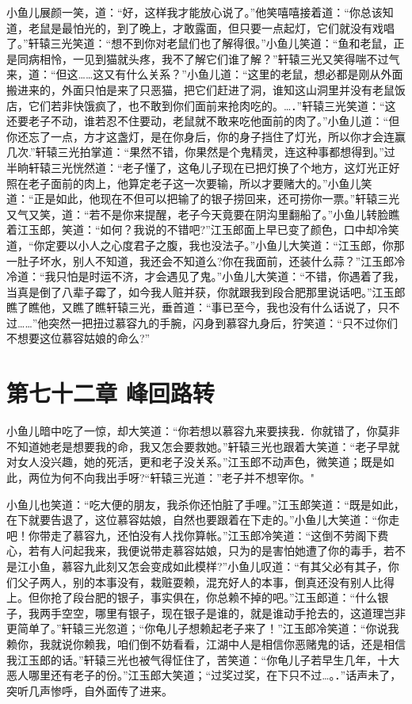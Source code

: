 \documentclass[12pt,oneside]{book}
\begin{document}
小鱼儿展颜一笑，道：``好，这样我才能放心说了。''他笑嘻嘻接着道：``你总该知道，老鼠是最怕光的，到了晚上，才敢露面，但只要一点起灯，它们就没有戏唱了。''轩辕三光笑道：``想不到你对老鼠们也了解得很。''小鱼儿笑道：``鱼和老鼠，正是同病相怜，一见到猫就头疼，我不了解它们谁了解？''轩辕三光又笑得喘不过气来，道：``但这\ldots\ldots 这又有什么关系？''小鱼儿道：``这里的老鼠，想必都是刚从外面搬进来的，外面只怕是来了只恶猫，把它们赶进了洞，谁知这山洞里并没有老鼠饭店，它们若非快饿疯了，也不敢到你们面前来抢肉吃的。\ldots．''轩辕三光笑道：``这还要老子不动，谁若忍不住要动，老鼠就不敢来吃他面前的肉了。''小鱼儿道：``但你还忘了一点，方才这盏灯，是在你身后，你的身子挡住了灯光，所以你才会连赢几次.''轩辕三光拍掌道：``果然不错，你果然是个鬼精灵，连这种事都想得到。''过半晌轩辕三光恍然道：``老子懂了，这龟儿子现在已把灯换了个地方，这灯光正好照在老子面前的肉上，他算定老子这一次要输，所以才要赌大的。''小鱼儿笑道：``正是如此，他现在不但可以把输了的银子捞回来，还可捞你一票。''轩辕三光又气又笑，道：``若不是你来提醒，老子今天竟要在阴沟里翻船了。''小鱼儿转脸瞧着江玉郎，笑道：``如何？我说的不错吧?''江玉郎面上早已变了颜色，口中却冷笑道，``你定要以小人之心度君子之腹，我也没法子。''小鱼儿大笑道：``江玉郎，你那一肚子坏水，别人不知道，我还会不知道么?你在我面前，还装什么蒜？''江玉郎冷冷道：``我只怕是时运不济，才会遇见了鬼。''小鱼儿大笑道：``不错，你遇着了我，当真是倒了八辈子霉了，如今我人赃并获，你就跟我到段合肥那里说话吧。''江玉郎瞧了瞧他，又瞧了瞧轩辕三光，垂首道：``事已至今，我也没有什么话说了，只不过\ldots\ldots{}''他突然一把扭过慕容九的手腕，闪身到慕容九身后，狞笑道：``只不过你们不想要这位慕容姑娘的命么?''

\hypertarget{ux7b2cux4e03ux5341ux4e8cux7ae0-ux5cf0ux56deux8defux8f6c}{%
\chapter{第七十二章
峰回路转}\label{ux7b2cux4e03ux5341ux4e8cux7ae0-ux5cf0ux56deux8defux8f6c}}

小鱼儿暗中吃了一惊，却大笑道：``你若想以慕容九来要挟我．你就错了，你莫非不知道她老是想要我的命，我又怎会要救她。''轩辕三光也跟着大笑道：``老子早就对女人没兴趣，她的死活，更和老子没关系。''江玉郎不动声色，微笑道；既是如此，两位为何不向我出手呀?``轩辕三光道：''老子并不想宰你。"

小鱼儿也笑道：``吃大便的朋友，我杀你还怕脏了手哩。''江玉郎笑道：``既是如此，在下就要告退了，这位慕容姑娘，自然也要跟着在下走的。''小鱼儿大笑道：``你走吧！你带走了慕容九，还怕没有人找你算帐。''江玉郎冷笑道：``这倒不劳阁下费心，若有人问起我来，我便说带走慕容姑娘，只为的是害怕她遭了你的毒手，若不是江小鱼，慕容九此刻又怎会变成如此模样?''小鱼儿叹道：``有其父必有其子，你们父子两人，别的本事没有，栽赃耍赖，混充好人的本事，倒真还没有别人比得上。但你抢了段台肥的银子，事实俱在，你总赖不掉的吧。''江玉郎道：``什么银子，我两手空空，哪里有银子，现在银子是谁的，就是谁动手抢去的，这道理岂非更简单了。''轩辕三光忽道；``你龟儿子想赖起老子来了！''江玉郎冷笑道：``你说我赖你，我就说你赖我，咱们倒不妨看看，江湖中人是相信你恶赌鬼的话，还是相信我江玉郎的话。''轩辕三光也被气得怔住了，苦笑道：``你龟儿子若早生几年，十大恶人哪里还有老子的份。''江玉郎大笑道；``过奖过奖，在下只不过\ldots。．''话声未了，突听几声惨呼，自外面传了进来。
\end{document}
